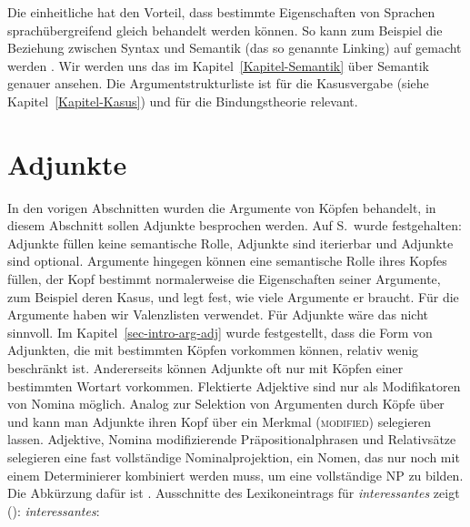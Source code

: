 Die einheitliche \argstl hat den Vorteil, dass bestimmte Eigenschaften von Sprachen sprachübergreifend
gleich behandelt werden können. So kann zum Beispiel die Beziehung zwischen Syntax und Semantik (das
so genannte Linking) auf \argst gemacht werden \citep*{DKW2024a}. Wir werden uns das im Kapitel~\ref{Kapitel-Semantik}
über Semantik genauer ansehen. Die Argumentstrukturliste ist für die Kasusvergabe (siehe Kapitel~\ref{Kapitel-Kasus})
und für die Bindungstheorie relevant.
  
\section{Adjunkte}
\label{sec-Adjunkte-psg}

In den vorigen Abschnitten wurden die Argumente von Köpfen behandelt, in diesem Abschnitt sollen
Adjunkte besprochen werden. Auf S.\,\pageref{adj-kriterien} wurde festgehalten: Adjunkte füllen keine semantische
Rolle, Adjunkte sind iterierbar und Adjunkte sind optional. Argumente hingegen können eine
semantische Rolle ihres Kopfes füllen, der Kopf bestimmt normalerweise die Eigenschaften seiner
Argumente, zum Beispiel deren Kasus, und legt fest, wie viele Argumente er braucht. Für die
Argumente haben wir Valenzlisten verwendet. Für Adjunkte wäre das nicht sinnvoll. Im
Kapitel~\ref{sec-intro-arg-adj} wurde festgestellt, dass die Form
von Adjunkten, die mit bestimmten Köpfen vorkommen können, relativ wenig beschränkt ist. Andererseits
können Adjunkte oft nur mit Köpfen einer bestimmten Wortart vorkommen. Flektierte
Adjektive sind \zb nur als Modifikatoren von Nomina möglich. 
\eal
{}
\zl
Analog zur Selektion von Argumenten durch Köpfe über \spr und \comps kann
man Adjunkte ihren Kopf über ein Merkmal (\textsc{modified}) selegieren lassen.
Adjektive, Nomina modifizierende Präpositionalphrasen und Relativsätze
selegieren eine fast vollständige Nominalprojektion, \dash ein Nomen, das
nur noch mit einem Determinierer kombiniert werden muss, um eine vollständige
NP zu bilden. Die Abkürzung dafür ist \nbar. Ausschnitte des Lexikoneintrags für \emph{interessantes} zeigt ():
\ea{}
\label{le-interessantes}
\emph{interessantes}:\\
